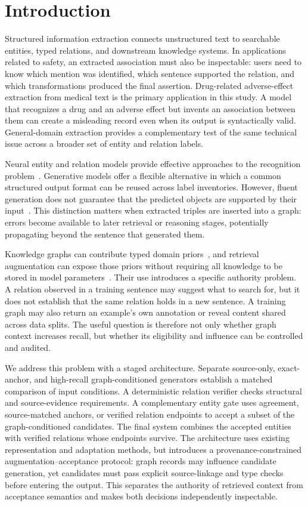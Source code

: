 \documentclass[a4paper,fleqn,numbers,doubleblind]{cas-dc}
\begin{document}
\section{Introduction}
\label{sec:introduction}
Structured information extraction connects unstructured text to searchable
entities, typed relations, and downstream knowledge systems. In applications
related to safety, an extracted association must also be inspectable: users
need to know which mention was identified, which sentence supported the
relation, and which transformations produced the final assertion. Drug-related
adverse-effect extraction from medical text is the primary application in this
study. A model that
recognizes a drug and an adverse effect but invents an association between them
can create a misleading record even when its output is syntactically valid.
General-domain extraction provides a complementary test of the same technical
issue across a broader set of entity and relation labels.

Neural entity and relation models provide effective approaches to the
recognition problem~\cite{li2022ner}. Generative models offer a
flexible alternative in which a common structured output format can be reused
across label inventories. However, fluent generation does not guarantee that
the predicted objects are supported by their input~\cite{ji2023hallucination}.
This distinction matters when extracted triples are inserted into a graph:
errors become available to later retrieval or reasoning stages, potentially
propagating beyond the sentence that generated them.

Knowledge graphs can contribute typed domain priors~\cite{hogan2021kg}, and
retrieval augmentation can expose those priors without requiring all knowledge
to be stored in model parameters~\cite{lewis2020rag}. Their use introduces a
specific authority problem. A relation observed in a training sentence may
suggest what to search for, but it does not establish that the same relation
holds in a new sentence. A training graph may also return an example's own
annotation or reveal content shared across data splits. The useful question is
therefore not only whether graph context increases recall, but whether its
eligibility and influence can be controlled and audited.

We address this problem with a staged architecture. Separate source-only,
exact-anchor, and high-recall graph-conditioned generators establish a matched
comparison of input conditions. A deterministic relation verifier checks
structural and source-evidence requirements. A complementary entity gate uses
agreement, source-matched anchors, or verified relation endpoints to accept a
subset of the graph-conditioned candidates. The final system combines the
accepted entities with verified relations whose endpoints survive. The
architecture uses existing representation and adaptation methods, but
introduces a provenance-constrained augmentation--acceptance protocol: graph
records may influence candidate generation, yet candidates must pass explicit
source-linkage and type checks before entering the output. This separates the
authority of retrieved context from acceptance semantics and makes both
decisions independently inspectable.
\end{document}
